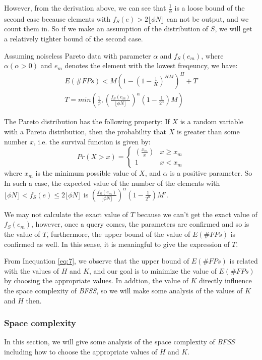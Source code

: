 \documentclass[conference]{IEEEtran}
\begin{document}
However, from the derivation above, we can see that $\frac{1}{\phi}$ is a loose bound of the second case because elements with $f_S(e)>2\lfloor \phi N\rfloor$ can not be output, and we count them in. So if we make an assumption of the distribution of $S$, we will get a relatively tighter bound of the second case.

\begin{theorem}\label{thm:3}
Assuming noiseless Pareto data with parameter $\alpha$ and $f_S(e_m)$, where $\alpha (\alpha >0)$ and $e_m$ denotes the element with the lowest freqeuncy, we have:
\begin{eqnarray}\label{eq:10}
	E(\#FPs)<M(1-(1-\frac{1}{K})^{HM})^H + T\\
	T=min(\frac{1}{\phi},(\frac{f_S(e_m)}{\lfloor \phi N\rfloor})^\alpha(1-\frac{1}{2^\alpha})M)
\end{eqnarray}
\end{theorem}

\begin{IEEEproof}
The Pareto distribution has the following property: If $X$ is a random variable with a Pareto distribution, then the probability that $X$ is greater than some number $x$, i.e. the survival function is given by:
$$Pr(X>x)=
\begin{cases}
(\frac{x_m}{x}) & x\geq x_m\\
1 & x<x_m
\end{cases}$$
where $x_m$ is the minimum possible value of $X$, and $\alpha$ is a positive parameter. So In such a case, the expected value of the number of the elements with $\lfloor \phi N\rfloor<f_S(e)\leq 2\lfloor\phi N\rfloor$ is $(\frac{f_S(e_m)}{\lfloor \phi N\rfloor})^\alpha(1-\frac{1}{2^\alpha})M'$.
\end{IEEEproof}
We may not calculate the exact value of $T$ because we can't get the exact value of $f_S(e_m)$, however, once a query comes, the parameters are confirmed and so is the value of $T$, furthermore, the upper bound of the value of $E(\#FPs)$ is confirmed as well. In this sense, it is meaningful to give the expression of $T$.\par
From Inequation \ref{eq:7}, we observe that the upper bound of $E(\#FPs)$ is related with the values of $H$ and $K$, and our goal is to minimize the value of  $E(\#FPs)$ by choosing the appropriate values. In addtion, the value of $K$ directly influence the space complexity of \emph{BFSS}, so we will make some analysis of the values of $K$ and $H$ then.
\subsubsection{\textbf{Space complexity}}\label{sec:space}
In this section, we will give some analysis of the space complexity of \emph{BFSS} including how to choose the appropriate values of $H$ and $K$.
\end{document}
